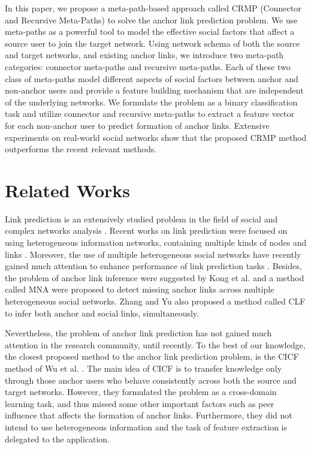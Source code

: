 \documentclass[conference]{IEEEtran}
\begin{document}
In this paper, we propose a meta-path-based approach called CRMP (Connector and Recursive Meta-Paths) to solve the anchor link prediction problem. We use meta-paths as a powerful tool to model the effective social factors that affect a source user to join the target network. Using network schema of both the source and target networks, and existing anchor links, we introduce two meta-path categories: connector meta-paths and recursive meta-paths. Each of these two class of meta-paths model different aspects of social factors between anchor and non-anchor users and provide a feature building mechanism that are independent of the underlying networks. We formulate the problem as a binary classification task and utilize connector and recursive meta-paths to extract a feature vector for each non-anchor user to predict formation of anchor links. Extensive experiments on real-world social networks show that the proposed CRMP method outperforms the recent relevant methods.

\section{Related Works}\label{sec:related}
Link prediction is an extensively studied problem in the field of social and complex networks analysis \cite{liben2007link, lu2011link}. Recent works on link prediction were focused on using heterogeneous information networks, containing multiple kinds of nodes and links \cite{sun2011co, yang2012link, davis2011}. Moreover, the use of multiple heterogeneous social networks have recently gained much attention to enhance performance of link prediction tasks \cite{zhang2013predicting, zhang2014transferring, zhang2014meta, Dong2015, Tang2012}. Besides, the problem of anchor link inference were suggested by Kong et al. \cite{kong2013} and a method called MNA were proposed to detect missing anchor links across multiple heterogeneous social networks. Zhang and Yu \cite{zhang2015integrated} also proposed a method called
CLF to infer both anchor and social links, simultaneously.

Nevertheless, the problem of anchor link prediction has not gained much attention in the research community, until recently. To the best of our knowledge, the closest proposed method to the anchor link prediction problem, is the CICF method of Wu et al. \cite{wu2014learning}. The main idea of CICF is to transfer knowledge only through those anchor users who behave consistently across both the source and target networks. However, they formulated the problem as a cross-domain learning task, and thus missed some other important factors such as peer influence that affects the formation of anchor links. Furthermore, they did not intend to use heterogeneous information and the task of feature extraction is delegated to the application. 
\end{document}
